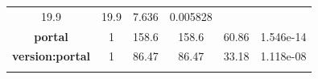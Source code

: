 \documentclass[]{article}
\begin{document}
\begin{longtable}[]{@{}cccccc@{}}
\begin{minipage}[t]{0.10\columnwidth}
19.9\strut
\end{minipage} & \begin{minipage}[t]{0.12\columnwidth}\centering\strut
19.9\strut
\end{minipage} & \begin{minipage}[t]{0.12\columnwidth}\centering\strut
7.636\strut
\end{minipage} & \begin{minipage}[t]{0.13\columnwidth}\centering\strut
0.005828\strut
\end{minipage}\tabularnewline
\begin{minipage}[t]{0.24\columnwidth}\centering\strut
\textbf{portal}\strut
\end{minipage} & \begin{minipage}[t]{0.07\columnwidth}\centering\strut
1\strut
\end{minipage} & \begin{minipage}[t]{0.10\columnwidth}\centering\strut
158.6\strut
\end{minipage} & \begin{minipage}[t]{0.12\columnwidth}\centering\strut
158.6\strut
\end{minipage} & \begin{minipage}[t]{0.12\columnwidth}\centering\strut
60.86\strut
\end{minipage} & \begin{minipage}[t]{0.13\columnwidth}\centering\strut
1.546e-14\strut
\end{minipage}\tabularnewline
\begin{minipage}[t]{0.24\columnwidth}\centering\strut
\textbf{version:portal}\strut
\end{minipage} & \begin{minipage}[t]{0.07\columnwidth}\centering\strut
1\strut
\end{minipage} & \begin{minipage}[t]{0.10\columnwidth}\centering\strut
86.47\strut
\end{minipage} & \begin{minipage}[t]{0.12\columnwidth}\centering\strut
86.47\strut
\end{minipage} & \begin{minipage}[t]{0.12\columnwidth}\centering\strut
33.18\strut
\end{minipage} & \begin{minipage}[t]{0.13\columnwidth}\centering\strut
1.118e-08\strut
\end{minipage}\tabularnewline
\begin{minipage}[t]{0.24\columnwidth}\centering\strut

\end{minipage}
\end{longtable}
\end{document}
